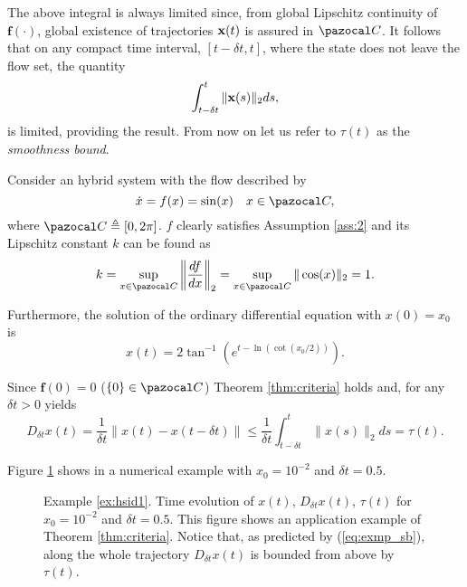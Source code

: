     The above integral is always limited since, from global Lipschitz continuity of $\mathbf{\mathbf{f}}(\cdot)$, global existence of trajectories $\mathbf{x}(t)$ is assured in $\C$. It follows that on any compact time interval, $[t-\delta t,t]$, where the state does not leave the flow set, the quantity
    \begin{equation}
        \int_{t- \delta t}^{t}\|\mathbf{x}(s)\|_2ds,
    \end{equation}
    is limited, providing the result.
\endproof
%
From now on let us refer to $\tau(t)$ as the \textit{smoothness bound}.
%
\begin{exmp}\label{ex:hsid1}
	Consider an hybrid system with the flow described by 
	\begin{equation}
	    \dot{x}={{f}}(x)=\sin(x)\quad x\in\C,
	\end{equation}
	where $\C\triangleq[0,2\pi]$. $f$ clearly satisfies Assumption \ref{ass:2} and its Lipschitz constant $k$ can be found as
	\begin{equation}
	    k=\sup\limits_{x\in\C}\left\|\frac{d {f}}{dx}\right\|_2=\sup\limits_{x\in\C}\|\cos(x)\|_2=1.
	\end{equation}
	
	Furthermore, the solution of the ordinary differential equation with $x(0)=x_0$ is\
	\begin{equation}
	    x(t)= 2\tan^{-1}\left(e^{t-\ln(\cot(x_0/2))}\right).
	\end{equation}
	
	Since ${\mathbf{f}}(0)=0$ ($\{0\}\in\C$) Theorem \ref{thm:criteria} holds and, for any $\delta t>0$ yields
	\begin{equation}\label{eq:exmp_sb}
	    D_{\delta t}x(t)=\frac{1}{\delta t}\|x(t)-x(t-\delta t)\|\leq\frac{1}{\delta t}\int_{t-\delta t}^{t}\|x(s)\|_2ds=\tau(t).
	\end{equation}
	
	Figure \ref{fig:ex1} shows in a numerical example with $x_0=10^{-2}$ and $\delta t = 0.5$. 
	\begin{figure}[!ht]
        \centering
        
        \caption[Example \ref{ex:hsid1}: Time evolution of the state, Euler derivative norm and smoothness bound.]{Example \ref{ex:hsid1}. Time evolution of $x(t)$, $D_{\delta t}x(t)$, $\tau(t)$ for $x_0=10^{-2}$ and $\delta t=0.5$. This figure shows an application example of Theorem \ref{thm:criteria}. Notice that, as predicted by (\ref{eq:exmp_sb}), along the whole trajectory $D_{\delta t}x(t)$ is bounded from above by $\tau(t)$.}
        \label{fig:ex1}
    \end{figure}
\end{exmp}
